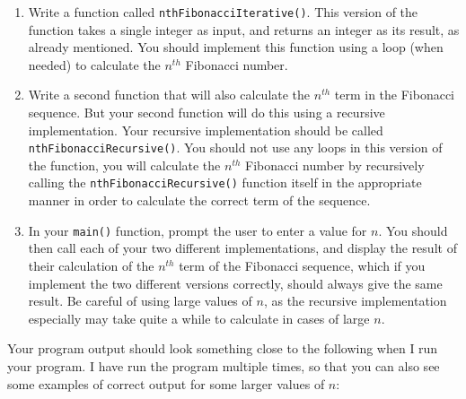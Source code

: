 \documentclass[11pt]{article}
\begin{document}
\begin{enumerate}
\item Write a function called \verb~nthFibonacciIterative()~.  This version of
   the function takes a single integer as input, and returns an
   integer as its result, as already mentioned.  You should implement
   this function using a loop (when needed) to calculate the $n^{th}$
   Fibonacci number.
\item Write a second function that will also calculate the $n^{th}$ term
   in the Fibonacci sequence.  But your second function will do this
   using a recursive implementation.  Your recursive implementation
   should be called \verb~nthFibonacciRecursive()~.  You should not use any
   loops in this version of the function, you will calculate the
   $n^{th}$ Fibonacci number by recursively calling the
   \verb~nthFibonacciRecursive()~ function itself in the appropriate manner
   in order to calculate the correct term of the sequence.
\item In your \verb~main()~ function, prompt the user to enter a value for $n$.
   You should then call each of your two different implementations, and
   display the result of their calculation of the $n^{th}$ term of the
   Fibonacci sequence, which if you implement the two different versions
   correctly, should always give the same result.  Be careful of using
   large values of $n$, as the recursive implementation especially may
   take quite a while to calculate in cases of large $n$.
\end{enumerate}

Your program output should look something close to the following when I
run your program.  I have run the program multiple times, so that you
can also see some examples of correct output for some larger values
of $n$:
\end{document}
